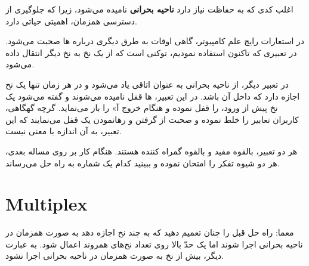 \documentclass{book}
\begin{document}
    اغلب کدی که به حفاظت نیاز دارد \textbf{ناحیه بحرانی} نامیده می‌شود، 
    زیرا که جلوگیری از دسترسی همزمان، اهمیتی حیاتی دارد. 

    در استعارات رایج علم کامپیوتر، گاهی اوقات به طرق دیگری درباره  ها صحبت می‌شود. 
    در تعبیری که تاکنون استفاده نمودیم،    توکنی است که از یک نخ به نخ دیگر انتقال داده می‌شود. 

    در تعبیر دیگر، از ناحیه بحرانی به عنوان اتاقی یاد می‌شود و در هر زمان تنها یک نخ اجازه دارد که داخل آن باشد. 
    در این تعبیر،  ها قفل نامیده می‌شوند و گفته می‌شود یک نخ پیش از ورود،    را قفل نموده 
    و هنگام خروج آ» را باز می‌نماید. گرچه گهگاهی، کاربران تعابیر را خلط نموده و صحبت از  گرفتن 
    و رهانمودن یک قفل می‌نمایند که این تعبیر، به آن اندازه با معنی نیست. 

    هر دو تعبیر، بالقوه مفید و بالقوه گمراه کننده هستند. 
    هنگام کار بر روی مساله بعدی،‌ هر دو شیوه تفکر را امتحان نموده و ببینید کدام یک شماره به راه حل می‌رساند. 


\section{Multiplex}
    
    معما: راه حل قبل را چنان تعمیم دهید که به چند نخ اجازه دهد به صورت همزمان در ناحیه بحرانی اجرا شوند اما یک حدّ بالا روی تعداد 
    نخ‌های همروند اعمال شود. به عبارت دیگر، بیش از  نخ به صورت همزمان در ناحیه بحرانی اجرا نشود. 
    
\end{document}
